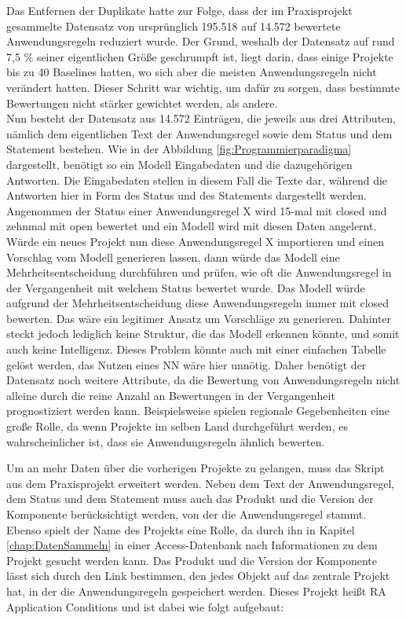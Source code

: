 Das Entfernen der Duplikate hatte zur Folge, dass der im Praxisprojekt gesammelte Datensatz von ursprünglich 195.518 auf 14.572 bewertete Anwendungsregeln reduziert wurde.
Der Grund, weshalb der Datensatz auf rund 7,5 \% seiner eigentlichen Größe geschrumpft ist, liegt darin, dass einige Projekte bis zu 40 Baselines hatten, 
wo sich aber die meisten Anwendungsregeln nicht verändert hatten. Dieser Schritt war wichtig, um dafür zu sorgen, dass bestimmte Bewertungen nicht stärker gewichtet werden,
als andere. \\

Nun besteht der Datensatz aus 14.572 Einträgen, die jeweils aus drei Attributen, nämlich dem eigentlichen Text der Anwendungsregel sowie dem Status und dem Statement bestehen.
Wie in der Abbildung \ref{fig:Programmierparadigma} dargestellt, benötigt so ein Modell Eingabedaten und die dazugehörigen Antworten. Die Eingabedaten stellen in diesem Fall
die Texte dar, während die Antworten hier in Form des Status und des Statements dargestellt werden. Angenommen der Status einer Anwendungsregel X wird 15-mal mit closed
und zehnmal mit open bewertet und ein Modell wird mit diesen Daten angelernt. Würde ein neues Projekt nun diese Anwendungsregel X importieren und einen Vorschlag vom Modell
generieren lassen, dann würde das Modell eine Mehrheitsentscheidung durchführen und prüfen, wie oft die Anwendungsregel in der Vergangenheit mit welchem Status bewertet wurde.
Das Modell würde aufgrund der Mehrheitsentscheidung diese Anwendungsregeln immer mit closed bewerten. Das wäre ein legitimer Ansatz um Vorschläge zu generieren. 
Dahinter steckt jedoch lediglich keine Struktur, die das Modell erkennen könnte, und somit auch keine Intelligenz. Dieses Problem könnte auch mit einer einfachen Tabelle 
gelöst werden, das Nutzen eines \ac{NN} wäre hier unnötig. Daher benötigt der Datensatz noch weitere Attribute, da die Bewertung von Anwendungsregeln nicht alleine durch die 
reine Anzahl an Bewertungen in der Vergangenheit prognostiziert werden kann. Beispielsweise spielen regionale Gegebenheiten eine große Rolle, 
da wenn Projekte im selben Land durchgeführt werden, es wahrscheinlicher ist, dass sie Anwendungsregeln ähnlich bewerten. 

Um an mehr Daten über die vorherigen Projekte zu gelangen, muss das Skript aus dem Praxisprojekt erweitert werden. Neben dem Text der Anwendungsregel, dem Status und dem Statement
muss auch das Produkt und die Version der Komponente berücksichtigt werden, von der die Anwendungsregel stammt. Ebenso spielt der Name des Projekts eine Rolle,
da durch ihn in Kapitel \ref*{chap:DatenSammeln} in einer Access-Datenbank nach Informationen zu dem Projekt gesucht werden kann. 
Das Produkt und die Version der Komponente lässt sich durch den Link bestimmen, den jedes Objekt auf das zentrale Projekt hat, in der die Anwendungsregeln gespeichert werden.
Dieses Projekt heißt RA Application Conditions und ist dabei wie folgt aufgebaut:

